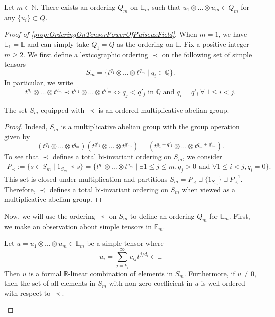\documentclass[10pt,a4paper]{amsart}
\begin{document}
\begin{prop}
    \label{prop:OrderingOnTensorPowerOfPuiseuxField}
    Let $m \in \mathbb{N}$. There exists an ordering $Q_m$ on $\mathbb{E}_m$ such that $u_1\otimes \dots \otimes u_m \in  Q_m$ for any $ \{u_i\}\subset Q$.
\end{prop}

\begin{proof}[Proof of \cref{prop:OrderingOnTensorPowerOfPuiseuxField}]
    When $m =1$, we have $\mathbb{E}_1 = \mathbb{E}$ and can simply take $Q_1 = Q$ as the ordering on $\mathbb{E}$. Fix a positive integer $m\geq 2$. We first define a lexicographic ordering $\prec$ on the following set of simple tensors
    \[
    S_m = \{t^{q_1} \otimes \dots \otimes t^{q_m} \mid q_i \in \mathbb{Q}\}.
    \]
    In particular, we write  
    \[
    t^{q_1} \otimes \dots \otimes t^{q_m} \prec t^{q'_1} \otimes \dots \otimes t^{q'_m} \Leftrightarrow q_{j} < q'_j \text{ in } \mathbb{Q} \text{ and } q_i = q'_i \ \forall \ 1 \leq i < j. 
    \]
    \begin{lem}
        The set $S_m$ equipped with $\prec$ is an ordered multiplicative abelian group.
    \end{lem}
    \begin{proof}
        Indeed, $S_m$ is a multiplicative abelian group with the group operation given by 
        \[
        (t^{q_1} \otimes \dots \otimes t^{q_m})(t^{q'_1} \otimes \dots \otimes t^{q'_m}) = (t^{q_1+q'_1} \otimes \dots \otimes t^{q_m+q'_m}).
        \]
        To see that $\prec$ defines a total bi-invariant ordering on $S_m$, we consider
        \begin{align*}
    P_{\prec} := \{s\in S_m \mid 1_{S_m} \prec s\} = \{t^{q_1} \otimes \dots \otimes t^{q_m} \mid \exists 1\leq j \leq m, q_j >0 \text{ and } \forall 1 \leq i <j, q_i = 0 \}.    
    \end{align*}
    This set is closed under multiplication and partitions $S_m = P_{\prec} \sqcup \{1_{S_m}\}\sqcup P_{\prec}^{-1}$. Therefore, $\prec$ defines a total bi-invariant ordering on $S_m$ when viewed as a multiplicative abelian group. 
    \end{proof}
    
    Now, we will use the ordering $\prec$ on $S_m$ to define an ordering $Q_m$ for $\mathbb{E}_m$. First, we make an observation about simple tensors in $\mathbb{E}_m$.

    \begin{lem}
        Let $u = u_1 \otimes \dots \otimes u_m \in \mathbb{E}_m$ be a simple tensor where
        \[
        u_i =\sum\limits_{j=k_i}^{\infty} c_{ij}t^{j/d_i} \in \mathbb{E}
        \]
        Then $u$ is a formal $\mathbb{R}$-linear combination of elements in $S_m$. Furthermore, if $u\neq 0$, then the set of all elements in $S_m$ with non-zero coefficient in $u$ is well-ordered with respect to $\prec$. 
    \end{lem}


\end{proof}
\end{document}
